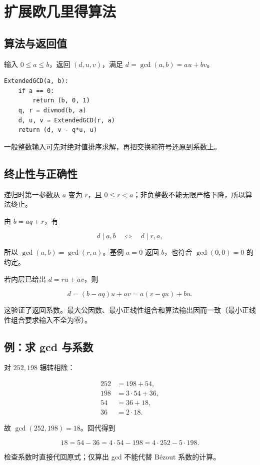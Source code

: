 \section{扩展欧几里得算法}


\subsection{算法与返回值}


输入 $0\le a\le b$，返回 $(d,u,v)$，满足 $d=\gcd(a,b)=au+bv$。

\begin{verbatim}
ExtendedGCD(a, b):
    if a == 0:
        return (b, 0, 1)
    q, r = divmod(b, a)
    d, u, v = ExtendedGCD(r, a)
    return (d, v - q*u, u)
\end{verbatim}


一般整数输入可先对绝对值排序求解，再把交换和符号还原到系数上。

\subsection{终止性与正确性}


递归时第一参数从 $a$ 变为 $r$，且 $0\le r<a$；非负整数不能无限严格下降，所以算法终止。

由 $b=aq+r$，有

\[
d\mid a,b\quad\Longleftrightarrow\quad d\mid r,a,
\]

所以 $\gcd(a,b)=\gcd(r,a)$。基例 $a=0$ 返回 $b$，也符合 $\gcd(0,0)=0$ 的约定。

若内层已给出 $d=ru+av$，则

\[
d=(b-aq)u+av=a(v-qu)+bu.
\]

这验证了返回系数。最大公因数、最小正线性组合和算法输出因而一致（最小正线性组合要求输入不全为零）。

\subsection{例：求 gcd 与系数}


对 $252,198$ 辗转相除：

\[
\begin{aligned}
252&=198+54,\\
198&=3\cdot54+36,\\
54&=36+18,\\
36&=2\cdot18.
\end{aligned}
\]

故 $\gcd(252,198)=18$。回代得到

\[
18=54-36=4\cdot54-198=4\cdot252-5\cdot198.
\]

检查系数时直接代回原式；仅算出 gcd 不能代替 Bézout 系数的计算。
